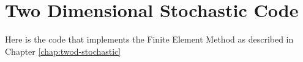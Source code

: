 \chapter{Two Dimensional Stochastic Code}\label{app:twod-stochastic-code}

Here is the code that implements the Finite Element Method as described in
Chapter \ref{chap:twod-stochastic}



